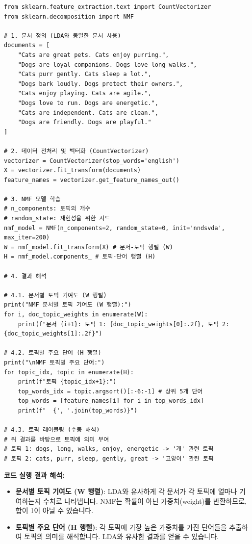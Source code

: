 \documentclass[11pt,a4paper]{article}
\theoremstyle{definition}
\begin{document}
\begin{lstlisting}[caption={Python을 이용한 NMF 구현 예시}, label={lst:python_nmf}]
from sklearn.feature_extraction.text import CountVectorizer
from sklearn.decomposition import NMF

# 1. 문서 정의 (LDA와 동일한 문서 사용)
documents = [
    "Cats are great pets. Cats enjoy purring.",
    "Dogs are loyal companions. Dogs love long walks.",
    "Cats purr gently. Cats sleep a lot.",
    "Dogs bark loudly. Dogs protect their owners.",
    "Cats enjoy playing. Cats are agile.",
    "Dogs love to run. Dogs are energetic.",
    "Cats are independent. Cats are clean.",
    "Dogs are friendly. Dogs are playful."
]

# 2. 데이터 전처리 및 벡터화 (CountVectorizer)
vectorizer = CountVectorizer(stop_words='english')
X = vectorizer.fit_transform(documents)
feature_names = vectorizer.get_feature_names_out()

# 3. NMF 모델 학습
# n_components: 토픽의 개수
# random_state: 재현성을 위한 시드
nmf_model = NMF(n_components=2, random_state=0, init='nndsvda', max_iter=200)
W = nmf_model.fit_transform(X) # 문서-토픽 행렬 (W)
H = nmf_model.components_ # 토픽-단어 행렬 (H)

# 4. 결과 해석

# 4.1. 문서별 토픽 기여도 (W 행렬)
print("NMF 문서별 토픽 기여도 (W 행렬):")
for i, doc_topic_weights in enumerate(W):
    print(f"문서 {i+1}: 토픽 1: {doc_topic_weights[0]:.2f}, 토픽 2: {doc_topic_weights[1]:.2f}")

# 4.2. 토픽별 주요 단어 (H 행렬)
print("\nNMF 토픽별 주요 단어:")
for topic_idx, topic in enumerate(H):
    print(f"토픽 {topic_idx+1}:")
    top_words_idx = topic.argsort()[:-6:-1] # 상위 5개 단어
    top_words = [feature_names[i] for i in top_words_idx]
    print(f"  {', '.join(top_words)}")

# 4.3. 토픽 레이블링 (수동 해석)
# 위 결과를 바탕으로 토픽에 의미 부여
# 토픽 1: dogs, long, walks, enjoy, energetic -> '개' 관련 토픽
# 토픽 2: cats, purr, sleep, gently, great -> '고양이' 관련 토픽
\end{lstlisting}

\begin{examplebox}
\textbf{코드 실행 결과 해석:}
\begin{itemize}
    \item \textbf{문서별 토픽 기여도 (W 행렬)}: LDA와 유사하게 각 문서가 각 토픽에 얼마나 기여하는지 수치로 나타냅니다. NMF는 확률이 아닌 가중치(weight)를 반환하므로, 합이 1이 아닐 수 있습니다.
    \item \textbf{토픽별 주요 단어 (H 행렬)}: 각 토픽에 가장 높은 가중치를 가진 단어들을 추출하여 토픽의 의미를 해석합니다. LDA와 유사한 결과를 얻을 수 있습니다.
\end{itemize}
\end{examplebox}
\end{document}
